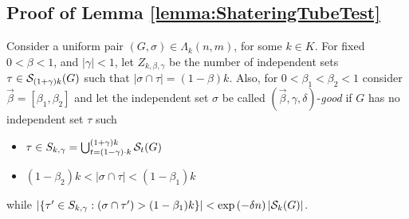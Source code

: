 \documentclass[a4paper,10pt]{article}
\begin{document}
\subsection{Proof of Lemma \ref{lemma:ShateringTubeTest}}

Consider a uniform pair $(G,\sigma)\in \Lambda_{k}(n,m)$, for some
$k\in K$. For fixed $0<\beta<1$, and $|\gamma|<1$, let $Z_{k,\beta,
\gamma}$ be the number of independent sets $\tau\in {\cal S}_{(1+\gamma)k}
(G)$ such that $|\sigma\cap \tau|=(1-\beta)k$. Also, for $0<\beta_1<\beta_2<1$
consider  $\vec{\beta}=[\beta_1,\beta_2]$ and let the independent
set $\sigma$ be called $(\vec{\beta},\gamma,\delta)$-{\em good} if
$G$ has no independent set $\tau$ such 
\begin{itemize}
	\item $\tau\in S_{k,{\gamma}}=\bigcup_{t=(1-\gamma)\cdot k}^{(1+\gamma)k}{\cal S}_{t}(G)$
	\item $(1-\beta_2)k<|\sigma\cap \tau|<(1-\beta_1)k$
\end{itemize}
while $|\{\tau'\in S_{k,{\gamma}}:(\sigma\cap \tau')>(1-\beta_1)k\}|<	\exp\left(-\delta n\right)
|{\cal S}_k(G)|$.
\end{document}
